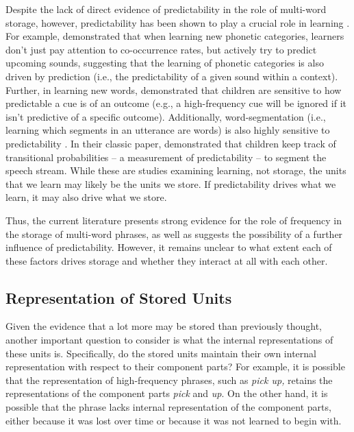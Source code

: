 \documentclass[
  authoryear,
  preprint,
  1p,
  onecolumn]{elsarticle}
\begin{document}
Despite the lack of direct evidence of predictability in the role of
multi-word storage, however, predictability has been shown to play a
crucial role in learning
\citep{olejarczuk2018, ramscar2013, saffran1996}. For example,
\citet{olejarczuk2018} demonstrated that when learning new phonetic
categories, learners don't just pay attention to co-occurrence rates,
but actively try to predict upcoming sounds, suggesting that the
learning of phonetic categories is also driven by prediction (i.e., the
predictability of a given sound within a context). Further, in learning
new words, \citet{ramscar2013} demonstrated that children are sensitive
to how predictable a cue is of an outcome (e.g., a high-frequency cue
will be ignored if it isn't predictive of a specific outcome).
Additionally, word-segmentation (i.e., learning which segments in an
utterance are words) is also highly sensitive to predictability
\citep{saffran1996}. In their classic paper, \citet{saffran1996}
demonstrated that children keep track of transitional probabilities -- a
measurement of predictability -- to segment the speech stream. While
these are studies examining learning, not storage, the units that we
learn may likely be the units we store. If predictability drives what we
learn, it may also drive what we store.

Thus, the current literature presents strong evidence for the role of
frequency in the storage of multi-word phrases, as well as suggests the
possibility of a further influence of predictability. However, it
remains unclear to what extent each of these factors drives storage and
whether they interact at all with each other.

\subsection{Representation of Stored
Units}\label{representation-of-stored-units}

Given the evidence that a lot more may be stored than previously
thought, another important question to consider is what the internal
representations of these units is. Specifically, do the stored units
maintain their own internal representation with respect to their
component parts? For example, it is possible that the representation of
high-frequency phrases, such as \emph{pick up,} retains the
representations of the component parts \emph{pick} and \emph{up}. On the
other hand, it is possible that the phrase lacks internal representation
of the component parts, either because it was lost over time or because
it was not learned to begin with.
\end{document}
